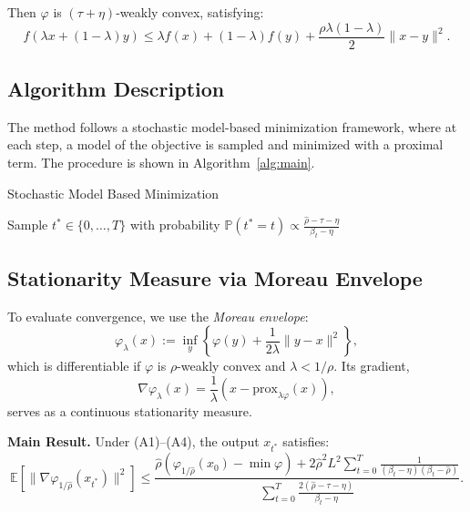 \documentclass{article}
\begin{document}
Then \( \varphi \) is \( (\tau + \eta) \)-weakly convex, satisfying:
\[
f(\lambda x + (1 - \lambda)y) \leq \lambda f(x) + (1 - \lambda) f(y) + \frac{\rho \lambda (1 - \lambda)}{2} \|x - y\|^2.
\]

\subsection{Algorithm Description}

The method follows a stochastic model-based minimization framework, where at each step, a model of the objective is sampled and minimized with a proximal term. The procedure is shown in Algorithm~\ref{alg:main}.

\begin{algorithm}[H]
\caption{Stochastic Model Based Minimization}
\label{alg:main}

Sample $t^* \in \{0, \ldots, T\}$ with probability $\mathbb{P}(t^* = t) \propto \frac{\hat{\rho} - \tau - \eta}{\beta_t - \eta}$\;
\end{algorithm}

\subsection{Stationarity Measure via Moreau Envelope}

To evaluate convergence, we use the \textit{Moreau envelope}:
\[
\varphi_\lambda(x) := \inf_{y} \left\{ \varphi(y) + \frac{1}{2\lambda} \|y - x\|^2 \right\},
\]
which is differentiable if $\varphi$ is $\rho$-weakly convex and $\lambda < 1/\rho$. Its gradient,
\[
\nabla \varphi_\lambda(x) = \frac{1}{\lambda}(x - \text{prox}_{\lambda \varphi}(x)),
\]
serves as a continuous stationarity measure.

\textbf{Main Result.} Under (A1)–(A4), the output $x_{t^*}$ satisfies:
\begin{equation}
\mathbb{E}\left[ \|\nabla \varphi_{1/\hat{\rho}}(x_{t^*})\|^2 \right]
\leq
\frac{ \hat{\rho} (\varphi_{1/\hat{\rho}}(x_0) - \min \varphi) + 2\hat{\rho}^2 L^2 \sum_{t=0}^T \frac{1}{(\beta_t - \eta)(\beta_t - \hat{\rho})} }{ \sum_{t=0}^T \frac{2(\hat{\rho} - \tau - \eta)}{\beta_t - \eta} }.
\label{eq:moreau_rate}
\end{equation}
\end{document}
